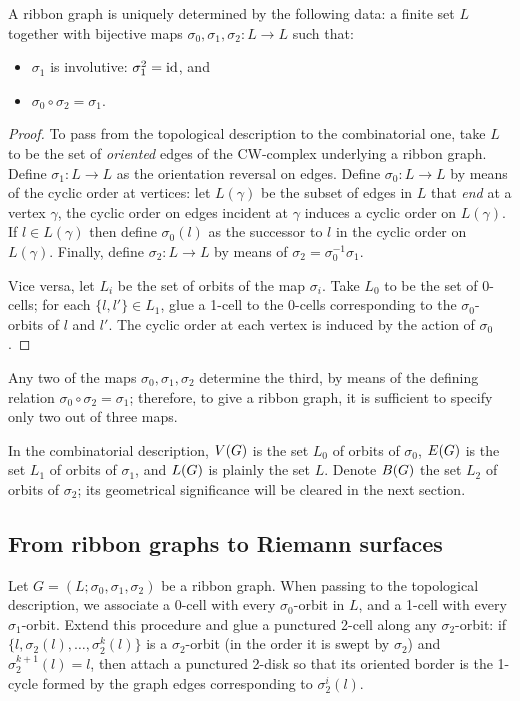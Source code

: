\begin{lemma}
  A ribbon graph is uniquely determined by the following data: a
  finite set $L$ together with bijective maps $\sigma_0, \sigma_1, \sigma_2: L \to L$ such
  that:
  \begin{itemize}
  \item $\sigma_1$ is involutive: $\sigma_1^2 = \operatorname{id}$, and
  \item $\sigma_0 \circ \sigma_2 = \sigma_1$.
  \end{itemize}
\end{lemma}
\begin{proof}
  To pass from the topological description to the combinatorial one,
  take $L$ to be the set of \emph{oriented} edges of the CW-complex
  underlying a ribbon graph.  Define $\sigma_1:L\to L$ as the orientation
  reversal on edges.  Define $\sigma_0:L\to L$ by means of the cyclic order
  at vertices: let $L(\gamma)$ be the subset of edges in $L$ that
  \emph{end} at a vertex $\gamma$, the cyclic order on edges incident at
  $\gamma$ induces a cyclic order on $L(\gamma)$.  If $l\in L(\gamma)$ then
  define $\sigma_0(l)$ as the successor to $l$ in the cyclic order on
  $L(\gamma)$.  Finally, define $\sigma_2: L \to L$ by means of
  $\sigma_2=\sigma_0^{-1}\sigma_1$.

  Vice versa, let $L_i$ be the set of orbits of the map $\sigma_i$.  Take
  $L_0$ to be the set of 0-cells; for each $\{l,l'\} \in L_1$, glue a
  1-cell to the 0-cells corresponding to the $\sigma_0$-orbits of $l$ and
  $l'$.  The cyclic order at each vertex is induced by the action of
  $\sigma_0$.
\end{proof}
Any two of the maps $\sigma_0, \sigma_1, \sigma_2$ determine the third, by means of
the defining relation $\sigma_0 \circ \sigma_2 = \sigma_1$; therefore, to give a ribbon
graph, it is sufficient to specify only two out of three maps.

In the combinatorial description, $V(G)$ is the set $L_0$ of
orbits of $\sigma_0$, $E(G)$ is the set $L_1$ of orbits of $\sigma_1$, and
$L(G)$ is plainly the set $L$.  Denote $B(G)$ the set $L_2$
of orbits of $\sigma_2$; its geometrical significance will be cleared in
the next section.


\subsection{From ribbon graphs to Riemann surfaces}
\label{sec:rg-to-surfaces}

Let $G = (L; \sigma_0, \sigma_1, \sigma_2)$ be a ribbon graph.  When passing to the
topological description, we associate a 0-cell with every $\sigma_0$-orbit
in $L$, and a 1-cell with every $\sigma_1$-orbit.  Extend this procedure
and glue a punctured 2-cell along any $\sigma_2$-orbit: if $\{l, \sigma_2(l), \ldots,
\sigma_2^k(l)\}$ is a $\sigma_2$-orbit (in the order it is swept by $\sigma_2$) and
$\sigma_2^{k+1}(l) = l$, then attach a punctured 2-disk so that its oriented
border is the 1-cycle formed by the graph edges corresponding to
$\sigma_2^i(l)$.

